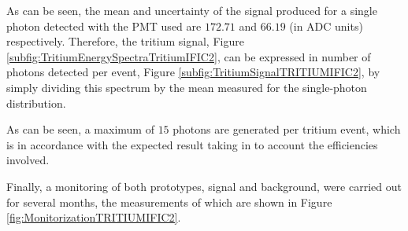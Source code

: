 
As can be seen, the mean and uncertainty of the signal produced for a single photon detected with the PMT used are $172.71$ and $66.19$ (in ADC units) respectively. Therefore, the tritium signal, Figure \ref{subfig:TritiumEnergySpectraTritiumIFIC2}, can be expressed in number of photons detected per event, Figure \ref{subfig:TritiumSignalTRITIUMIFIC2}, by simply dividing this spectrum by the mean measured for the single-photon distribution.


As can be seen, a maximum of $15$ photons are generated per tritium event, which is in accordance with the expected result taking in to account the efficiencies involved. 


Finally, a monitoring of both prototypes, signal and background, were carried out for several months, the measurements of which are shown in Figure \ref{fig:MonitorizationTRITIUMIFIC2}.

